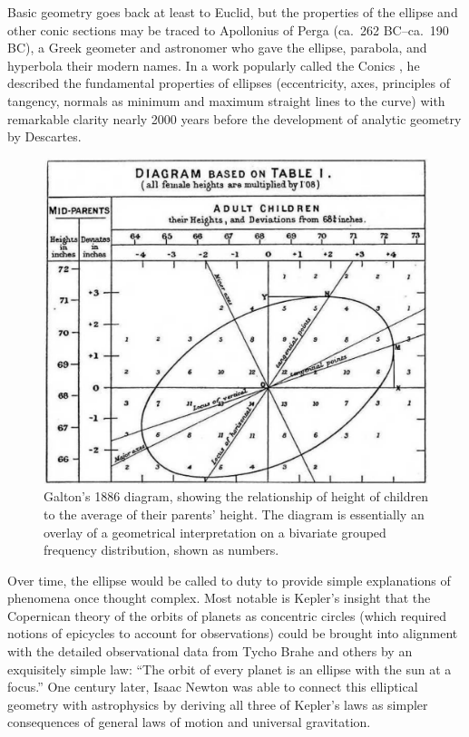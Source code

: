 Basic geometry goes back at least to Euclid, but the properties of the ellipse and  other
conic sections may be traced to Apollonius  of Perga (ca.~262 BC--ca.~190 BC),  a
Greek geometer and astronomer who gave the ellipse, parabola, and hyperbola their
modern names. In a work popularly called the Conics \citep{Boyer:91}, he  described
the  fundamental  properties  of  ellipses  (eccentricity,  axes,  principles of
tangency,  normals as  minimum and  maximum straight  lines to  the curve)  with
remarkable clarity nearly 2000 years before the development of analytic geometry
by Descartes.

\begin{figure}[htb]
  \centering
  \includegraphics[width=.65\textwidth]{fig/galton-corr}
  \caption{Galton's 1886 diagram, showing the relationship of height of children
to the average of their parents' height. The diagram is essentially an overlay
of a geometrical interpretation on a bivariate grouped frequency distribution, shown
as numbers.}%
  \label{fig:galton-corr}
\end{figure}

Over time, the ellipse would be called to duty to provide simple explanations of
phenomena  once thought  complex.  Most  notable is  Kepler's insight  that the
Copernican theory of the orbits of planets as concentric circles (which required
notions  of  epicycles  to  account  for  observations)  could  be  brought into
alignment with the detailed observational data from  Tycho Brahe and others by an exquisitely  simple
law: ``The orbit  of every planet  is an ellipse  with the sun  at a focus.''  One
century later, Isaac  Newton was able  to connect this elliptical geometry with astrophysics by
deriving all  three of Kepler's  laws as
simpler consequences of general laws of motion and universal gravitation.


